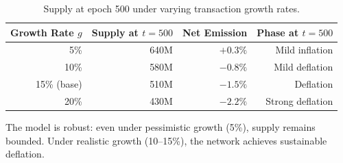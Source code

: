 \begin{table}[H]
\centering
\caption{Supply at epoch 500 under varying transaction growth rates.}
\label{tab:sensitivity}
\begin{tabular}{rrrr}
\toprule
\textbf{Growth Rate $g$} & \textbf{Supply at $t=500$} & \textbf{Net Emission} & \textbf{Phase at $t=500$} \\
\midrule
5\% & 640M & $+0.3\%$ & Mild inflation \\
10\% & 580M & $-0.8\%$ & Mild deflation \\
15\% (base) & 510M & $-1.5\%$ & Deflation \\
20\% & 430M & $-2.2\%$ & Strong deflation \\
\bottomrule
\end{tabular}
\end{table}

The model is robust: even under pessimistic growth (5\%), supply remains bounded. Under realistic growth (10--15\%), the network achieves sustainable deflation.

